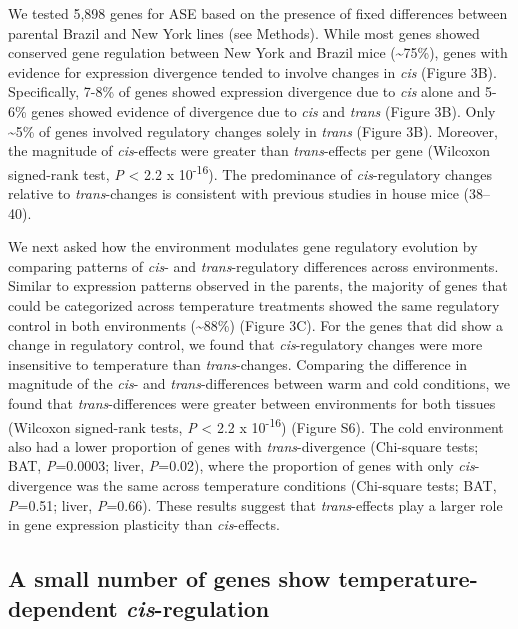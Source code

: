 \documentclass[9pt,twocolumn,twoside,lineno]{pnas-new}
\begin{document}
We tested 5,898 genes for ASE based on the presence of fixed differences
between parental Brazil and New York lines (see Methods). While most
genes showed conserved gene regulation between New York and Brazil mice
(\textasciitilde75\%), genes with evidence for expression divergence
tended to involve changes in \emph{cis} (Figure 3B). Specifically, 7-8\%
of genes showed expression divergence due to \emph{cis} alone and 5-6\%
genes showed evidence of divergence due to \emph{cis} and \emph{trans}
(Figure 3B). Only \textasciitilde5\% of genes involved regulatory
changes solely in \emph{trans} (Figure 3B). Moreover, the magnitude of
\emph{cis}-effects were greater than \emph{trans}-effects per gene
(Wilcoxon signed-rank test, \emph{P} \textless{} 2.2 x
10\textsuperscript{-16}). The predominance of \emph{cis}-regulatory
changes relative to \emph{trans}-changes is consistent with previous
studies in house mice (38--40).

We next asked how the environment modulates gene regulatory evolution by
comparing patterns of \emph{cis}- and \emph{trans}-regulatory
differences across environments. Similar to expression patterns observed
in the parents, the majority of genes that could be categorized across
temperature treatments showed the same regulatory control in both
environments (\textasciitilde88\%) (Figure 3C). For the genes that did
show a change in regulatory control, we found that \emph{cis}-regulatory
changes were more insensitive to temperature than \emph{trans}-changes.
Comparing the difference in magnitude of the \emph{cis}- and
\emph{trans}-differences between warm and cold conditions, we found that
\emph{trans}-differences were greater between environments for both
tissues (Wilcoxon signed-rank tests, \emph{P} \textless{} 2.2 x
10\textsuperscript{-16}) (Figure S6). The cold environment also had a
lower proportion of genes with \emph{trans}-divergence (Chi-square
tests; BAT, \emph{P}=0.0003; liver, \emph{P}=0.02), where the proportion
of genes with only \emph{cis}-divergence was the same across temperature
conditions (Chi-square tests; BAT, \emph{P}=0.51; liver, \emph{P}=0.66).
These results suggest that \emph{trans}-effects play a larger role in
gene expression plasticity than \emph{cis}-effects.

\hypertarget{a-small-number-of-genes-show-temperature-dependent-cis-regulation}{%
\subsection*{\texorpdfstring{A small number of genes show
temperature-dependent
\emph{cis}-regulation}{A small number of genes show temperature-dependent cis-regulation}}\label{a-small-number-of-genes-show-temperature-dependent-cis-regulation}}
\end{document}
